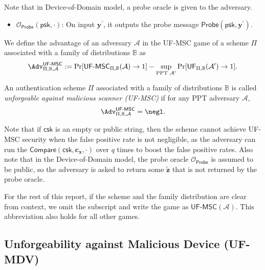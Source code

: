 Note that in Device-of-Domain model, a probe oracle is given to the adversary.

\begin{itemize}
	\item $\mathcal{O}_\textsf{Probe}(\textsf{psk}, \cdot)$: On input $\mathbf{y}^\prime$, it outputs the probe message $\textsf{Probe}(\textsf{psk}, \mathbf{y}^\prime)$.
\end{itemize}

We define the advantage of an adversary $\mathcal{A}$ in the \textsf{UF-MSC} game of a scheme $\Pi$ associated with a family of distributions $\mathbb{B}$ as
\[
	\Adv^{\textsf{UF-MSC}}_{\Pi, \mathbb{B}, \mathcal{A}} := \Pr[{\textsf{UF-MSC}}_{\Pi, \mathbb{B}}(\mathcal{A}) \to 1] -
	\sup_{\text{PPT } \mathcal{A}^\prime} \Pr[\textsf{UF}_{\Pi, \mathbb{B}}(\mathcal{A}^\prime) \to 1].
\]

An authentication scheme $\Pi$ associated with a family of distributions $\mathbb{B}$ is called \emph{unforgeable against malicious scanner (UF-MSC)} if for any PPT adversary $\mathcal{A}$,
\[
	\Adv^{\textsf{UF-MSC}}_{\Pi, \mathbb{B}, \mathcal{A}} = \negl.
\]

Note that if $\textsf{csk}$ is an empty or public string, then the scheme cannot achieve UF-MSC security when the false positive rate is not negligible, as the adversary can run the $\textsf{Compare}(\textsf{csk}, \mathbf{c_x}, \cdot)$ over $q$ times to boost the false positive rates.
Also note that in the Device-of-Domain model, the probe oracle $\mathcal{O}_\textsf{Probe}$ is assumed to be public, so the adversary is asked to return some $\mathbf{\tilde{z}}$ that is not returned by the probe oracle.

For the rest of this report, if the scheme and the family distribution are clear from context, we omit the subscript and write the game as $\textsf{UF-MSC}(\mathcal{A})$. This abbreviation also holds for all other games.



\subsection{Unforgeability against Malicious Device (UF-MDV)}
\label{sec:uf-mdv_game}

